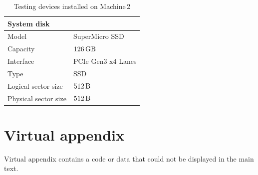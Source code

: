 \documentclass[
  color, %
  table, %
  lof,   %
  lot,   %
]{fithesis3}
\begin{document}
\begin{table}
\begin{tabular}{|l|l|}
    \hline
    \multicolumn{2}{|l|}{System disk} \\ \hline %
    Model & SuperMicro SSD  \\
    \hline
    Capacity & $\SI{126}{\giga\byte}$  \\
    \hline
    Interface & PCIe Gen3 x4 Lanes  \\
    \hline
    Type & SSD \\
    \hline    
   Logical sector size & $\SI{512}{\byte}$ \\    
    \hline    
    Physical sector size & $\SI{512}{\byte}$ \\
    \hline   
\end{tabular}
\caption{Testing devices installed on Machine\,2}
\end{table}




\clearpage
\chapter{Virtual appendix}
\label{virtual}
Virtual appendix contains a code or data that could not be displayed in the main text.
\end{document}
